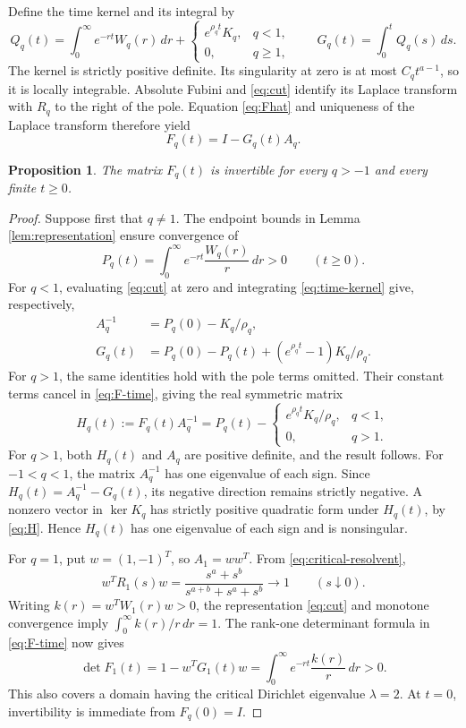 \documentclass[11pt]{article}
\newtheorem{proposition}[theorem]{Proposition}
\newcommand{\Id}{I}
\begin{document}
Define the time kernel and its integral by
\begin{equation}\label{eq:time-kernel}
 Q_q(t)=\int_0^\infty e^{-rt}W_q(r)\,dr
       +\begin{cases}e^{\rho_qt}K_q,&q<1,\\0,&q\ge1,
        \end{cases}
 \qquad G_q(t)=\int_0^tQ_q(s)\,ds.
\end{equation}
The kernel is strictly positive definite. Its singularity at zero is at
most $C_qt^{a-1}$, so it is locally integrable. Absolute Fubini and
\eqref{eq:cut} identify its Laplace transform with $R_q$ to the right of
the pole. Equation \eqref{eq:Fhat} and uniqueness of the Laplace transform
therefore yield
\begin{equation}\label{eq:F-time}
 F_q(t)=\Id-G_q(t)A_q.
\end{equation}

\begin{proposition}\label{prop:invertibility}
The matrix $F_q(t)$ is invertible for every $q>-1$ and every finite
$t\ge0$.
\end{proposition}

\begin{proof}
Suppose first that $q\ne1$. The endpoint bounds in Lemma
\ref{lem:representation} ensure convergence of
\[
 P_q(t)=\int_0^\infty e^{-rt}\frac{W_q(r)}r\,dr>0
 \qquad(t\ge0).
\]
For $q<1$, evaluating \eqref{eq:cut} at zero and integrating
\eqref{eq:time-kernel} give, respectively,
\[
 \begin{aligned}
 A_q^{-1}&=P_q(0)-K_q/\rho_q,\\
 G_q(t)&=P_q(0)-P_q(t)+(e^{\rho_qt}-1)K_q/\rho_q.
 \end{aligned}
\]
For $q>1$, the same identities hold with the pole terms omitted.
Their constant terms cancel in \eqref{eq:F-time}, giving the real symmetric
matrix
\begin{equation}\label{eq:H}
 H_q(t):=F_q(t)A_q^{-1}
 =P_q(t)-\begin{cases}e^{\rho_qt}K_q/\rho_q,&q<1,\\0,&q>1.
            \end{cases}
\end{equation}
For $q>1$, both $H_q(t)$ and $A_q$ are positive definite, and the result
follows. For $-1<q<1$, the matrix $A_q^{-1}$ has one eigenvalue of each
sign. Since $H_q(t)=A_q^{-1}-G_q(t)$, its negative direction remains
strictly negative. A nonzero vector in $\ker K_q$ has strictly positive
quadratic form under $H_q(t)$, by \eqref{eq:H}. Hence $H_q(t)$ has one
eigenvalue of each sign and is nonsingular.

For $q=1$, put $w=(1,-1)^T$, so $A_1=ww^T$. From
\eqref{eq:critical-resolvent},
\[
 w^TR_1(s)w=\frac{s^a+s^b}{s^{a+b}+s^a+s^b}\longrightarrow1
       \qquad(s\downarrow0).
\]
Writing $k(r)=w^TW_1(r)w>0$, the representation \eqref{eq:cut} and
monotone convergence imply $\int_0^\infty k(r)/r\,dr=1$.
The rank-one determinant formula in \eqref{eq:F-time} now gives
\[
 \det F_1(t)=1-w^TG_1(t)w
           =\int_0^\infty e^{-rt}\frac{k(r)}r\,dr>0.
\]
This also covers a domain having the critical Dirichlet eigenvalue
$\lambda=2$. At $t=0$, invertibility is immediate from $F_q(0)=\Id$.
\end{proof}
\end{document}
